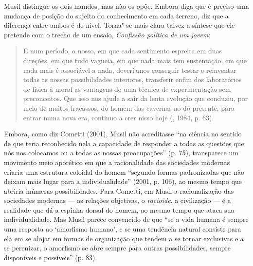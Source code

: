Musil distingue os dois mundos, mas não os opõe. Embora diga que é
preciso uma mudança de posição do sujeito do conhecimento em cada
terreno, diz que a diferença entre ambos é de nível. Torna"-se mais clara
talvez a síntese que ele pretende com o trecho de um ensaio,
\emph{Confissão política de um jovem}:

\begin{quote}
E num período, o nosso, em que cada sentimento espreita em duas
direções, em que tudo vagueia, em que nada mais tem sustentação, em que
nada mais é associável a nada, deveríamos conseguir testar e reinventar
todas as nossas possibilidades interiores, transferir enfim dos
laboratórios de física à moral as vantagens de uma técnica de
experimentação sem preconceitos. Que isso nos ajude a sair da lenta
evolução que conduziu, por meio de muitos fracassos, do homem das
cavernas ao do presente, para entrar numa nova era, continuo a crer
nisso hoje (, 1984, p. 63).
\end{quote}

Embora, como diz Cometti (2001), Musil não acreditasse ``na ciência no
sentido de que teria reconhecido nela a capacidade de responder a todas
as questões que nós nos colocamos ou a todas as nossas preocupações''
(p. 75), transparece um movimento meio aporético em que a racionalidade
das sociedades modernas criaria uma estrutura coloidal do homem
``segundo formas padronizadas que não deixam mais lugar para a
individualidade'' (2001, p. 106), ao mesmo tempo que abriria inúmeras
possibilidades. Para Cometti, em Musil a racionalização das sociedades
modernas --- as relações objetivas, o \emph{racioide}, a civilização --- é
a realidade que dá a espinha dorsal do homem, ao mesmo tempo que ataca
sua individualidade. Mas Musil parece convencido de que ``se a vida
humana é sempre uma resposta ao `amorfismo humano', e se uma tendência
natural consiste para ela em se alojar em formas de organização que
tendem a se tornar exclusivas e a se perenizar, o amorfismo se abre
sempre para outras possibilidades, sempre disponíveis e possíveis'' (p. 83).

